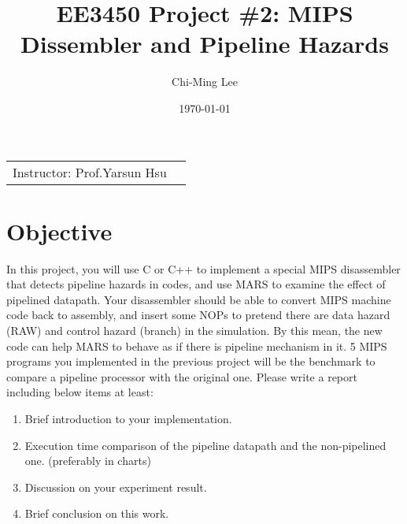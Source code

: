 \documentclass{article}
\title{EE3450 Project \#2: MIPS Dissembler and Pipeline Hazards} %
\author{Chi-Ming Lee} %
\date{\today} %
\begin{document}
\maketitle %

\begin{center}
\begin{tabular}{l r}
Instructor: Prof.Yarsun Hsu %
\end{tabular}
\end{center}



\section{Objective}

In this project, you will use C or C++ to implement a special MIPS disassembler\cite{dis} that detects pipeline hazards in codes, and use MARS to examine the effect of pipelined datapath.
Your disassembler should be able to convert MIPS machine code back to assembly, and insert some NOPs to pretend there are data hazard (RAW) and control hazard (branch) in the simulation. By this mean, the new code can help MARS to behave as if there is pipeline mechanism in it.
5 MIPS programs you implemented in the previous project will be the benchmark to compare a pipeline processor with the original one. 
Please write a report including below items at least:

\begin{enumerate}
    \item Brief introduction to your implementation.
    \item Execution time comparison of the pipeline datapath and the non-pipelined one. (preferably in charts) 
    \item Discussion on your experiment result.
    \item Brief conclusion on this work.
\end{enumerate}

\end{document}
